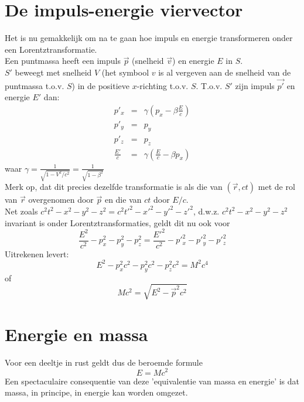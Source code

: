 \section{De impuls-energie viervector}
Het is nu gemakkelijk om na te gaan hoe impuls en energie transformeren
onder een Lorentztransformatie.\\
Een puntmassa heeft een impuls $\vec{p}$ (snelheid $\vec{v}$) en
energie $E$ in $S$.\\
$S'$ beweegt met snelheid $V$ (het symbool $v$ is al vergeven aan de 
snelheid van de puntmassa t.o.v. $S$) in de
positieve $x$-richting t.o.v. $S$.
T.o.v. $S'$ zijn impuls $\vec{p'}$ en energie $E'$ dan:
\begin{eqnarray*}
p'_{x} & = & \gamma(p_{x} - \beta \frac{E}{c}) \\
p'_{y} & = & p_{y} \\
p'_{z} & = & p_{z} \\
\frac{E'}{c} & = & \gamma (\frac{E}{c} - \beta p_{x})
\end{eqnarray*}
waar $\gamma = \frac{1}{\sqrt{1-V^2/c^2}} = \frac{1}{\sqrt{1-\beta ^{2}}}$\\
Merk op, dat dit precies dezelfde transformatie is als die van $(\vec{r}, ct)$
met de rol van $\vec{r}$ overgenomen door $\vec{p}$
en die van $ct$ door $E/c$.\\
Net zoals 
$c^{2}t^{2} - x^{2} - y^{2} -z^{2} = c^{2}t'^{2} - x'^{2} - y'^{2} -z'^{2}$,
d.w.z.  $c^{2}t^{2} - x^{2} - y^{2} -z^{2}$
invariant is onder Lorentztransformaties, geldt dit nu ook voor
\begin{displaymath}
\frac{E^{2}}{c^{2}} - p^{2}_{x} - p^{2}_{y} - p^{2}_{z} = \frac{E'^{2}}{c^{2}} - p'^{2}_{x} - p'^{2}_{y} - p'^{2}_{z}
\end{displaymath}
Uitrekenen levert:
\begin{displaymath}
E^{2} - p^{2}_{x}c^{2} - p^{2}_{y}c^{2} - p^{2}_{z}c^{2} = M^{2}c^{4}
\end{displaymath}
of
\begin{displaymath}
Mc^{2} = \sqrt{E^{2} - \vec{p}^{2}c^{2}}
\end{displaymath}

\section{Energie en massa}
Voor een deeltje in rust geldt dus de beroemde formule
\begin{displaymath}
E = Mc^{2}
\end{displaymath}
Een spectaculaire consequentie van deze 'equivalentie van massa en energie'
is dat massa, in principe, in energie kan worden omgezet.

